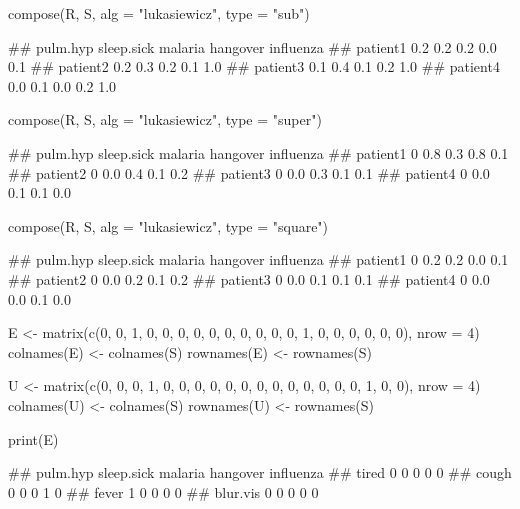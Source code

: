 \documentclass{article}\usepackage[]{graphicx}\usepackage[]{color}
\begin{document}
\begin{Schunk}
% --begin: "comp.subsupsquare"
\begin{Sinput}
compose(R, S, alg = "lukasiewicz", type = "sub")
\end{Sinput}
\begin{Soutput}
##          pulm.hyp sleep.sick malaria hangover influenza
## patient1      0.2        0.2     0.2      0.0       0.1
## patient2      0.2        0.3     0.2      0.1       1.0
## patient3      0.1        0.4     0.1      0.2       1.0
## patient4      0.0        0.1     0.0      0.2       1.0
\end{Soutput}
\begin{Sinput}
compose(R, S, alg = "lukasiewicz", type = "super")
\end{Sinput}
\begin{Soutput}
##          pulm.hyp sleep.sick malaria hangover influenza
## patient1        0        0.8     0.3      0.8       0.1
## patient2        0        0.0     0.4      0.1       0.2
## patient3        0        0.0     0.3      0.1       0.1
## patient4        0        0.0     0.1      0.1       0.0
\end{Soutput}
\begin{Sinput}
compose(R, S, alg = "lukasiewicz", type = "square")
\end{Sinput}
\begin{Soutput}
##          pulm.hyp sleep.sick malaria hangover influenza
## patient1        0        0.2     0.2      0.0       0.1
## patient2        0        0.0     0.2      0.1       0.2
## patient3        0        0.0     0.1      0.1       0.1
## patient4        0        0.0     0.0      0.1       0.0
\end{Soutput}
%
% --end: "comp.subsupsquare"
\end{Schunk}

\begin{Schunk}
\begin{Sinput}
E <- matrix(c(0, 0, 1, 0, 0, 0, 0, 0, 0, 0, 0, 0, 0, 1, 0, 0, 0, 0, 0, 
    0), nrow = 4)
colnames(E) <- colnames(S)
rownames(E) <- rownames(S)

U <- matrix(c(0, 0, 0, 1, 0, 0, 0, 0, 0, 0, 0, 0, 0, 0, 0, 0, 0, 1, 0, 
    0), nrow = 4)
colnames(U) <- colnames(S)
rownames(U) <- rownames(S)
\end{Sinput}
\end{Schunk}

\begin{Schunk}
% --begin: "comp.e"
\begin{Sinput}
print(E)
\end{Sinput}
\begin{Soutput}
##          pulm.hyp sleep.sick malaria hangover influenza
## tired           0          0       0        0         0
## cough           0          0       0        1         0
## fever           1          0       0        0         0
## blur.vis        0          0       0        0         0
\end{Soutput}
%
% --end: "comp.e"
\end{Schunk}
\end{document}
